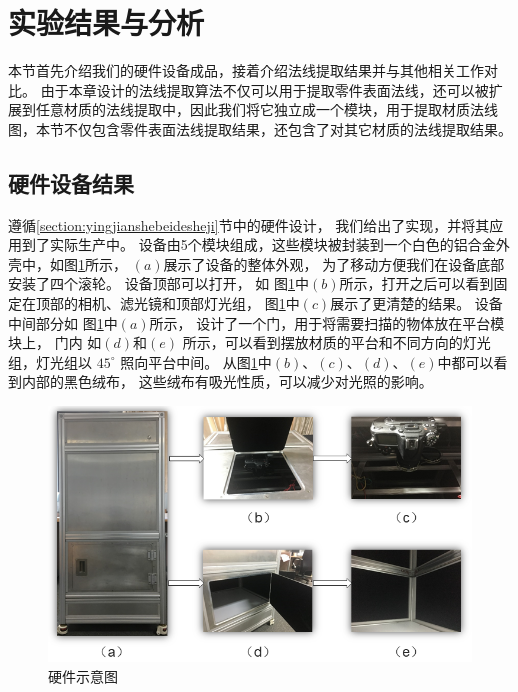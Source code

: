 \section{实验结果与分析}

本节首先介绍我们的硬件设备成品，接着介绍法线提取结果并与其他相关工作对比。
由于本章设计的法线提取算法不仅可以用于提取零件表面法线，还可以被扩展到任意材质的法线提取中，因此我们将它独立成一个模块，用于提取材质法线图，本节不仅包含零件表面法线提取结果，还包含了对其它材质的法线提取结果。

\subsection{硬件设备结果}

遵循\ref{section:yingjianshebeidesheji}节中的硬件设计，
我们给出了实现，并将其应用到了实际生产中。
设备由5个模块组成，这些模块被封装到一个白色的铝合金外壳中，如图\ref{fig:yingjianjieguo}所示，
$(a)$展示了设备的整体外观，
为了移动方便我们在设备底部安装了四个滚轮。
设备顶部可以打开，
如
图\ref{fig:yingjianjieguo}中$(b)$所示，打开之后可以看到固定在顶部的相机、滤光镜和顶部灯光组，
图\ref{fig:yingjianjieguo}中$(c)$展示了更清楚的结果。
设备中间部分如
图\ref{fig:yingjianjieguo}中$(a)$所示，
设计了一个门，用于将需要扫描的物体放在平台模块上，
门内
如$(d)$和$(e)$
所示，可以看到摆放材质的平台和不同方向的灯光组，灯光组以
${45}^{\circ}$
照向平台中间。
从图\ref{fig:yingjianjieguo}中$(b)$、$(c)$、$(d)$、$(e)$中都可以看到内部的黑色绒布，
这些绒布有吸光性质，可以减少对光照的影响。

\begin{figure}[htbp]
\centering
\centerline{\includegraphics[width=1.0\linewidth]{figures/yingjianjieguo.png}}
\caption{硬件示意图}
\label{fig:yingjianjieguo}
\end{figure}

